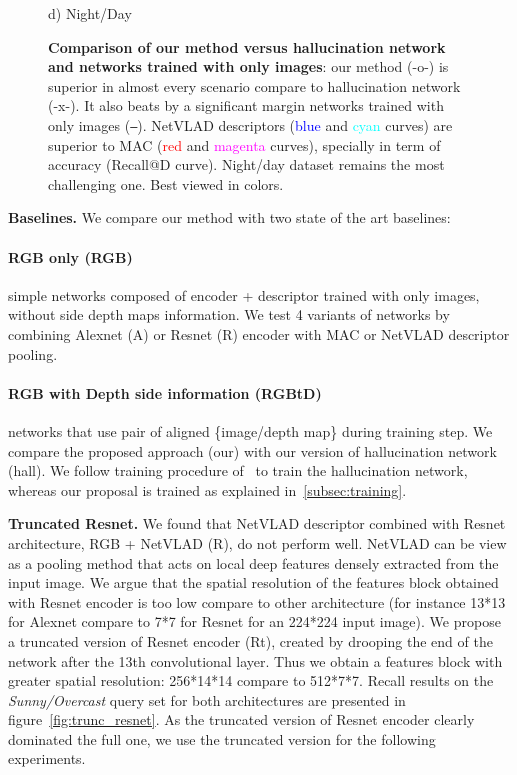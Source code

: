 \begin{figure}
\begin{minipage}{0.85\linewidth}
\begin{minipage}{0.49\linewidth}
		{\scriptsize d) Night/Day}
	\end{minipage}
	
	\end{minipage}

	\caption{\label{fig:results} \textbf{Comparison of our method versus hallucination network and networks trained with only images}: our method (-o-) is superior in almost every scenario compare to hallucination network (-x-). It also beats by a significant margin networks trained with only images (\texttt{--}). NetVLAD descriptors (\textcolor{blue}{blue} and \textcolor{cyan}{cyan} curves) are superior to MAC (\textcolor{red}{red} and \textcolor{magenta}{magenta} curves), specially in term of accuracy (Recall@D curve). Night/day dataset remains the most challenging one. Best viewed in colors.}
\end{figure}

\noindent\textbf{Baselines.} We compare our method with two state of the art baselines:
    \paragraph{RGB only (\textbf{RGB})} simple networks composed of encoder + descriptor trained with only images, without side depth maps information. We test 4 variants of networks by combining Alexnet (A) or Resnet (R) encoder with MAC or NetVLAD descriptor pooling.
    \paragraph{RGB with Depth side information (\textbf{RGBtD})} networks that use pair of aligned \{image/depth map\} during training step. We compare the proposed approach (our) with our version of hallucination network~\cite{Hoffman2016} (hall). We follow training procedure of~\cite{Hoffman2016} to train the hallucination network, whereas our proposal is trained as explained in~\ref{subsec:training}. 

\vspace{4pt}\noindent\textbf{Truncated Resnet.} We found that NetVLAD descriptor combined with Resnet architecture, RGB + NetVLAD (R), do not perform well. NetVLAD can be view as a pooling method that acts on local deep features densely extracted from the input image. We argue that the spatial resolution of the features block obtained with Resnet encoder is too low compare to other architecture (for instance 13*13 for Alexnet compare to 7*7 for Resnet for an 224*224 input image). We propose a truncated version of Resnet encoder (Rt), created by drooping the end of the network after the 13th convolutional layer. Thus we obtain a features block with greater spatial resolution: 256*14*14 compare to 512*7*7. Recall results on the \textit{Sunny/Overcast} query set for both architectures are presented in figure~\ref{fig:trunc_resnet}. As the truncated version of Resnet encoder clearly dominated the full one, we use the truncated version for the following experiments.


